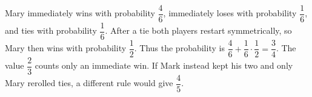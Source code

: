 Mary immediately wins with probability $\dfrac{4}{6}$, immediately loses with probability $\dfrac{1}{6}$, and ties with probability $\dfrac{1}{6}$. After a tie both players restart symmetrically, so Mary then wins with probability $\dfrac{1}{2}$. Thus the probability is $\dfrac{4}{6}+\dfrac{1}{6}\cdot\dfrac{1}{2}=\boxed{\dfrac{3}{4}}$. The value $\dfrac{2}{3}$ counts only an immediate win. If Mark instead kept his two and only Mary rerolled ties, a different rule would give $\dfrac{4}{5}$.
